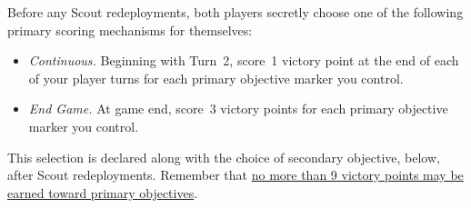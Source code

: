 \begin{scoring}

\begin{primaries}
  Before any Scout redeployments, both players secretly choose one of
  the following primary scoring mechanisms for themselves:

  \begin{itemize}
  \item {\textit{Continuous.}} Beginning with Turn~2, score~1 victory
    point at the end of each of your player turns for each primary
    objective marker you control.
  
  \item {\textit{End Game.}} At game end, score~3 victory points for
    each primary objective marker you control.
  
  \end{itemize}

  This selection is declared along with the choice of secondary
  objective, below, after Scout redeployments.  Remember that
  \underline{no more than 9 victory points may be earned toward
    primary objectives}.  
\end{primaries}

\end{scoring}
